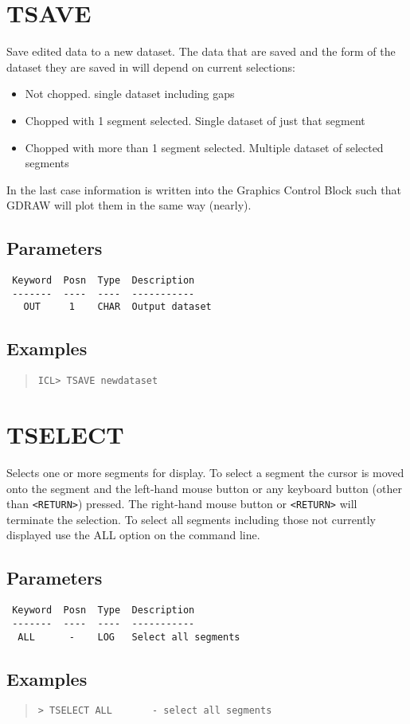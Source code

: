\documentclass{book}
\renewcommand{\_}{{\tt\char'137}}     %
\begin{document}
\section{TSAVE}
Save edited data to a new dataset. The data that are saved
and the form of the dataset they are saved in will depend on
current selections:

\begin{itemize}
\item Not chopped. single dataset including gaps
\item Chopped with 1 segment selected. Single dataset of just that segment
\item Chopped with more than 1 segment selected. Multiple dataset of
selected segments
\end{itemize}
In the last case information is written into the Graphics
Control Block such that GDRAW will plot them in the same
way (nearly).

\subsection{Parameters}
\begin{verbatim}
 Keyword  Posn  Type  Description
 -------  ----  ----  -----------
   OUT     1    CHAR  Output dataset

\end{verbatim}\subsection{Examples}
\begin{quote}\begin{verbatim}
ICL> TSAVE newdataset
\end{verbatim}\end{quote}
\section{TSELECT}
Selects one or more segments for display. To select a segment
the cursor is moved onto the segment and the left-hand mouse
button or any keyboard button (other than \verb+<RETURN>+) pressed.
The right-hand mouse button or \verb+<RETURN>+ will terminate the
selection. To select all segments including those not currently
displayed use the ALL option on the command line.

\subsection{Parameters}
\begin{verbatim}
 Keyword  Posn  Type  Description
 -------  ----  ----  -----------
  ALL      -    LOG   Select all segments

\end{verbatim}\subsection{Examples}
\begin{quote}\begin{verbatim}
> TSELECT ALL       - select all segments
\end{verbatim}\end{quote}
\end{document}
